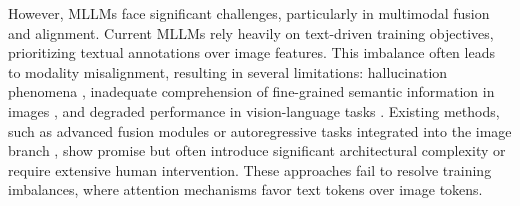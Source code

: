 
However, MLLMs face significant challenges, particularly in multimodal fusion and alignment. Current MLLMs rely heavily on text-driven training objectives, prioritizing  textual annotations over image features. This imbalance often leads to modality misalignment, resulting in several limitations: hallucination phenomena \cite{wang2024mllm, wang2023amber}, inadequate comprehension of fine-grained semantic information in images \cite{wu2024towards, lai2024lisa}, and degraded performance in vision-language tasks \cite{lin2024vila}. Existing methods, such as advanced fusion modules \cite{bai2023qwen, ye2023mplug, zhu2023minigpt} or autoregressive tasks integrated into the image branch \cite{tong2024metamorph, fini2024multimodal}, show promise but often introduce significant architectural complexity or require extensive human intervention. These approaches fail to resolve training imbalances, where attention mechanisms favor text tokens over image tokens.



